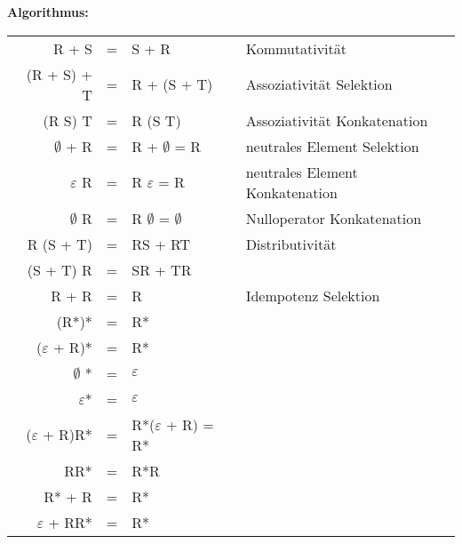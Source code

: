 \documentclass[11pt,
			a4paper,
			parskip=full,
			toc=bib,
			toc=idx,
			toc=listof,
			ngerman
			listof=totoc,]{scrartcl}
\newcommand{\concept}[1]{%
	\sf{%
		\textbf{%
				\textcolor{mymauve}{#1}%
		}%
	}%
	\rm%
}
\newenvironment{algo}[1]%
{	\begin{framed}
	\textbf{Algorithmus:} \concept{#1}}%
{\end{framed}}
\newenvironment{cmt}%
{\color{mygray} § }
{\color{black}}
\newcommand{\compress}{\vspace{-1em}}
\begin{document}



\compress
\compress
\begin{algo}{Rechenregeln für reguläre Ausdrücke.}

\compress
\begin{tabularx}{\textwidth}{r c l X}

R + S          & = &     S + R               & Kommutativität \\
(R + S) + T    & = &     R + (S + T)         & Assoziativität Selektion \\ 
(R S) T        & = &     R (S T)             & Assoziativität Konkatenation \\
$∅$ + R        & = &     R + $∅$ = R         & neutrales Element Selektion \\
$ε$ R          & = &     R $ε$ =   R         & neutrales Element Konkatenation \\
$∅$ R          & = &     R $∅$ = $∅$         & Nulloperator Konkatenation \\
R (S + T)      & = &     RS + RT             & Distributivität \\
(S + T)  R     & = &     SR + TR             & \\
R + R          & = &     R                   & Idempotenz Selektion \\
(R*)*          & = &     R*                  & \\
($ε$ + R)*     & = &     R*                  & \\
$∅$ *          & = &     $ε$                 & \\
$ε$*           & = &     $ε$                 & \\
($ε$ + R)R*    & = &     R*($ε$ + R) = R*    & \\
RR*            & = &     R*R                 & \\
R* + R         & = &     R*                  & \\
$ε$ + RR*      & = &     R*                  & \\
\end{tabularx}
\end{algo}
\end{document}
